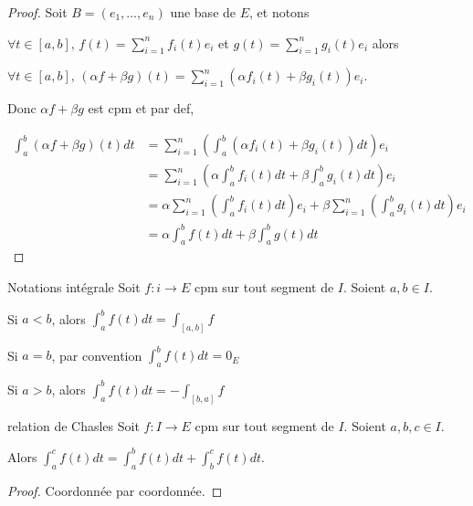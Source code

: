 
\begin{proof}
    Soit $B = (e_1, \ldots, e_n)$ une base de $E$, et notons 
    
    $\displaystyle \forall t \in [a, b], \, f(t) = \sum_{i=1}^n f_i(t)e_i$ et
    $\displaystyle g(t) = \sum_{i=1}^n g_i(t)e_i$ alors 

    $\displaystyle \forall t \in [a, b], \, (\alpha f + \beta g)(t) = \sum_{i=1}^n (\alpha f_i(t) + \beta g_i(t))e_i$.

    Donc $\alpha f + \beta g$ est cpm et par def,

    \begin{align*}
        \int_a^b (\alpha f + \beta g)(t) dt & = \sum_{i=1}^n \left( \int_a^b (\alpha f_i(t) + \beta g_i(t)) dt \right) e_i\\
        & = \sum_{i=1}^n \left( \alpha \int_a^b f_i(t) dt + \beta \int_a^b g_i(t) dt \right) e_i\\
        & = \alpha \sum_{i=1}^n \left( \int_a^b f_i(t) dt \right) e_i + \beta \sum_{i=1}^n \left( \int_a^b g_i(t) dt \right) e_i\\
        & = \alpha \int_a^b f(t) dt + \beta \int_a^b g(t) dt
    \end{align*}
\end{proof}


\begin{proposition}{Notations intégrale}{}
    Soit $f : i \to E$ cpm sur tout segment de $I$. Soient $a, b \in I$.

    Si $a < b$, alors $\displaystyle \int_a^b f(t) dt = \int_{[a, b]} f$

    Si $a = b$, par convention $\displaystyle \int_a^b f(t) dt = 0_E$

    Si $a > b$, alors $\displaystyle \int_a^b f(t) dt = - \int_{[b, a]} f$
    
\end{proposition}


\begin{proposition}{relation de Chasles}{}
    Soit $f : I \to E$ cpm sur tout segment de $I$. Soient $a, b, c \in I$.

    Alors $\displaystyle \int_a^c f(t) dt = \int_a^b f(t) dt + \int_b^c f(t) dt$.
    
\end{proposition}

\begin{proof}
    Coordonnée par coordonnée.
\end{proof}

